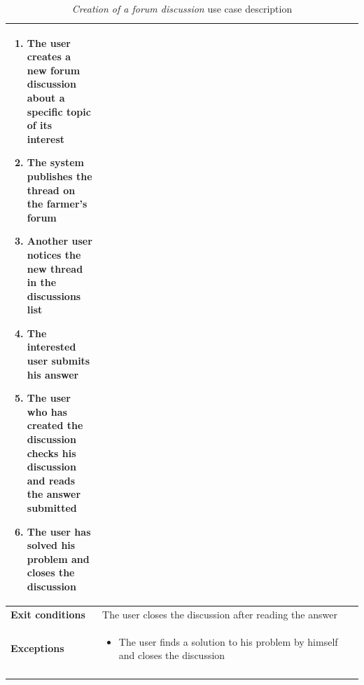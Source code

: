 \documentclass[10pt]{article}
\begin{document}
\begin{enumerate}[label=\textbf{UC\arabic*}]
\begin{longtable}{p{0.26\linewidth}p{0.75\linewidth}}
\begin{enumerate}
                \item The user creates a new forum discussion about a specific topic of its interest
                \item The system publishes the thread on the farmer's forum
                \item Another user notices the new thread in the discussions list
                \item The interested user submits his answer
                \item The user who has created the discussion checks his discussion and reads the answer submitted
                \item The user has solved his problem and closes the discussion
            \end{enumerate} \\
            \midrule
            \textbf{Exit conditions} & The user closes the discussion after reading the answer\\
            \midrule
            \textbf{Exceptions} & 
            \begin{itemize}
                \item The user finds a solution to his problem by himself and closes the discussion 
            \end{itemize} \\
            \bottomrule
            \caption{\emph{Creation of a forum discussion} use case description}
        \end{longtable}
    \newpage
\end{enumerate}
\end{document}
